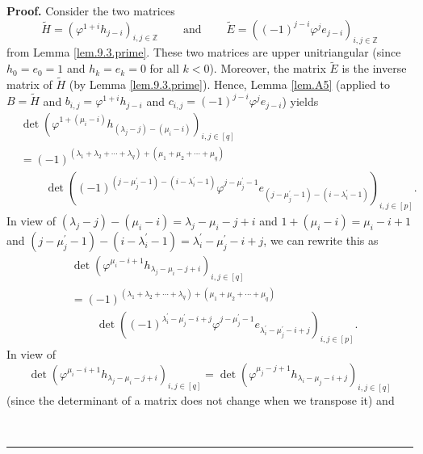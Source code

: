 \documentclass[numbers=enddot,12pt,final,onecolumn,notitlepage]{scrartcl}%
\theoremstyle{definition}
\newenvironment{proof}[1][Proof]{\noindent\textbf{#1.} }{\ \rule{0.5em}{0.5em}}
\begin{document}
\begin{enumerate}
\begin{proof}
Consider the two matrices%
\[
\widetilde{H}=\left(  \varphi^{1+i}h_{j-i}\right)  _{i,j\in\mathbb{Z}%
}\ \ \ \ \ \ \ \ \ \ \text{and}\ \ \ \ \ \ \ \ \ \ \widetilde{E}=\left(
\left(  -1\right)  ^{j-i}\varphi^{j}e_{j-i}\right)  _{i,j\in\mathbb{Z}}%
\]
from Lemma \ref{lem.9.3.prime}. These two matrices are upper unitriangular
(since $h_{0}=e_{0}=1$ and $h_{k}=e_{k}=0$ for all $k<0$). Moreover, the
matrix $\widetilde{E}$ is the inverse matrix of $\widetilde{H}$ (by Lemma
\ref{lem.9.3.prime}). Hence, Lemma \ref{lem.A5} (applied to $B=\widetilde{H}$
and $b_{i,j}=\varphi^{1+i}h_{j-i}$ and $c_{i,j}=\left(  -1\right)
^{j-i}\varphi^{j}e_{j-i}$) yields%
\begin{align*}
&  \det\left(  \varphi^{1+\left(  \mu_{i}-i\right)  }h_{\left(  \lambda
_{j}-j\right)  -\left(  \mu_{i}-i\right)  }\right)  _{i,j\in\left[  q\right]
}\\
&  =\left(  -1\right)  ^{\left(  \lambda_{1}+\lambda_{2}+\cdots+\lambda
_{q}\right)  +\left(  \mu_{1}+\mu_{2}+\cdots+\mu_{q}\right)  }\\
&  \ \ \ \ \ \ \ \ \ \ \det\left(  \left(  -1\right)  ^{\left(  j-\mu
_{j}^{\prime}-1\right)  -\left(  i-\lambda_{i}^{\prime}-1\right)  }%
\varphi^{j-\mu_{j}^{\prime}-1}e_{\left(  j-\mu_{j}^{\prime}-1\right)  -\left(
i-\lambda_{i}^{\prime}-1\right)  }\right)  _{i,j\in\left[  p\right]  }.
\end{align*}
In view of $\left(  \lambda_{j}-j\right)  -\left(  \mu_{i}-i\right)
=\lambda_{j}-\mu_{i}-j+i$ and $1+\left(  \mu_{i}-i\right)  =\mu_{i}-i+1$ and
$\left(  j-\mu_{j}^{\prime}-1\right)  -\left(  i-\lambda_{i}^{\prime
}-1\right)  =\lambda_{i}^{\prime}-\mu_{j}^{\prime}-i+j$, we can rewrite this
as%
\begin{align*}
&  \det\left(  \varphi^{\mu_{i}-i+1}h_{\lambda_{j}-\mu_{i}-j+i}\right)
_{i,j\in\left[  q\right]  }\\
&  =\left(  -1\right)  ^{\left(  \lambda_{1}+\lambda_{2}+\cdots+\lambda
_{q}\right)  +\left(  \mu_{1}+\mu_{2}+\cdots+\mu_{q}\right)  }\\
&  \ \ \ \ \ \ \ \ \ \ \det\left(  \left(  -1\right)  ^{\lambda_{i}^{\prime
}-\mu_{j}^{\prime}-i+j}\varphi^{j-\mu_{j}^{\prime}-1}e_{\lambda_{i}^{\prime
}-\mu_{j}^{\prime}-i+j}\right)  _{i,j\in\left[  p\right]  }.
\end{align*}
In view of%
\[
\det\left(  \varphi^{\mu_{i}-i+1}h_{\lambda_{j}-\mu_{i}-j+i}\right)
_{i,j\in\left[  q\right]  }=\det\left(  \varphi^{\mu_{j}-j+1}h_{\lambda
_{i}-\mu_{j}-i+j}\right)  _{i,j\in\left[  q\right]  }%
\]
(since the determinant of a matrix does not change when we transpose it) and%

\end{proof}
\end{enumerate}
\end{document}
